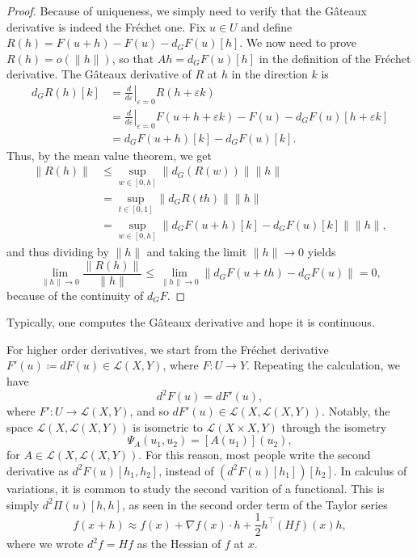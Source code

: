 \begin{proof}
    Because of uniqueness, we simply need to verify that the Gâteaux derivative is indeed the Fréchet one. Fix $u\in U$ and define $R(h) = F(u+h) - F(u) - d_G F(u)[h]$. We now need to prove $R(h)=o(\|h\|)$, so that $Ah=d_G F(u)[h]$ in the definition of the Fréchet derivative. The Gâteaux derivative of $R$ at $h$ in the direction $k$ is
    \begin{align*}
        d_G R(h)[k] &= \left.\frac{d}{d\varepsilon}\right|_{\varepsilon = 0} R(h+\varepsilon k) \\
        & = \left.\frac{d}{d\varepsilon}\right|_{\varepsilon = 0} F(u+h+\varepsilon k) - F(u) - d_G F(u)[h + \varepsilon k] \\
        & = d_G F(u+h)[k] - d_G F(u)[k].
    \end{align*}    
    Thus, by the mean value theorem, we get
    \begin{align*}
        \|R(h)\| &\leq \sup_{w\in [0,h]} \|d_G(R(w))\| \|h\|\\
        &=    \sup_{t\in [0,1]} \|d_G R(th)\| \|h\|\\
        &=    \sup_{w\in [0,h]} \|d_G F(u+h)[k] - d_G F(u)[k]\| \|h\|,
    \end{align*}
    and thus dividing by $\|h\|$ and taking the limit $\|h\|\to 0$ yields
    \begin{equation*}
        \lim_{\|h\|\to 0} \frac{\|R(h)\|}{\|h\|} \leq \lim_{\|h\|\to 0} \|d_G F(u+th) - d_G F(u)\| = 0,
    \end{equation*}    
    because of the continuity of $d_G F$.
\end{proof}
Typically, one computes the Gâteaux derivative and hope it is continuous.


For higher order derivatives, we start from the Fréchet derivative $F'(u) \coloneqq dF(u)\in \mathcal{L}(X,Y)$, where $F:U\to Y$. Repeating the calculation, we have
\begin{equation*}
    d^2 F(u) = dF'(u), 
\end{equation*} 
where $F': U\to \mathcal{L}(X,Y)$, and so $dF'(u) \in \mathcal{L}(X, \mathcal{L}(X,Y))$. Notably, the space $\mathcal{L}(X, \mathcal{L}(X,Y))$ is isometric to $\mathcal{L}(X\times X,Y)$ through the isometry
\begin{equation*}
    \Psi_A(u_1,u_2) = [A(u_1)](u_2),
\end{equation*} 
for $A\in \mathcal{L}(X,\mathcal{L}(X,Y))$. For this reason, most people write the second derivative as $d^2 F(u) [h_1,h_2]$, instead of $(d^2 F(u)[h_1])[h_2]$. In calculus of variations, it is common to study the second varition of a functional. This is simply $d^2 \Pi(u)[h,h]$, as seen in the second order term of the Taylor series
\begin{equation*}
    f(x+h)\approx f(x) + \nabla f(x) \cdot h + \frac{1}{2} h^\top (Hf)(x) h,
\end{equation*} 
where we wrote $d^2 f = Hf$ as the Hessian of $f$ at $x$.

